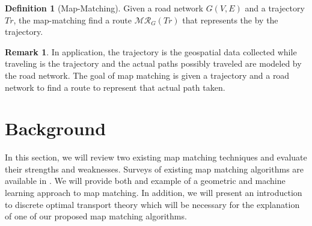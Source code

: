 \documentclass{article}
\numberwithin{equation}{section}
\theoremstyle{definition}
\newtheorem{definition}{Definition}[section]
\newtheorem{remark}[remark]{Remark}
\begin{document}
\begin{definition}[Map-Matching]
Given a road network $G(V, E)$ and a trajectory
$Tr$, the map-matching find a route $\mathcal{MR}_G(Tr)$ that represents the  by the trajectory.
\end{definition}

\begin{remark}
In application, the trajectory is the geospatial data collected while traveling is the trajectory and the actual paths possibly traveled are modeled by the road network. The goal of map matching is given a trajectory and a road network to find a route to represent that actual path taken. 
\end{remark}



    



\section{Background}

In this section, we will review two existing map matching techniques and evaluate their strengths and weaknesses. Surveys of existing map matching algorithms are available in \cite{C,Q}. We will provide both and example of a geometric and machine learning approach to map matching. 
In addition, we will present an introduction to discrete optimal transport theory which will be necessary for the explanation of one of our proposed map matching algorithms.
\end{document}
